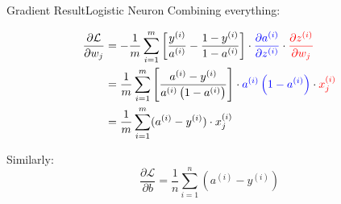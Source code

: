 \documentclass[aspectratio=169]{beamer}
\begin{document}
\begin{frame}{Gradient Result}{Logistic Neuron}
Combining everything:

\begin{align*}
\frac{\partial \mathcal{L}}{\partial w_j} &= 
-\frac{1}{m} \sum\limits_{i=1}^m \left[ \frac{y^{(i)}}{a^{(i)}} - \frac{1 - y^{(i)}}{1 - a^{(i)}} \right] \cdot \textcolor{blue}{\frac{\partial a^{(i)}}{\partial z^{(i)}}} \cdot \textcolor{red}{\frac{\partial z^{(i)}}{\partial w_j}} \\
&= \frac{1}{m} \sum\limits_{i=1}^m \left[ \frac{a^{(i)}- y^{(i)}}{a^{(i)}\left(1-a^{(i)}\right)} \right] \cdot \textcolor{blue}{a^{(i)}\left(1-a^{(i)}\right)} \cdot \textcolor{red}{x_j^{(i)}} \\
&= \frac{1}{m} \sum_{i=1}^m (a^{(i)} - y^{(i)}) \cdot x_j^{(i)}
\end{align*}

Similarly:
$$
\frac{\partial \mathcal{L}}{\partial b} = \frac{1}{n} \sum_{i=1}^n (a^{(i)} - y^{(i)})
$$
\end{frame}
%
%
\end{document}
